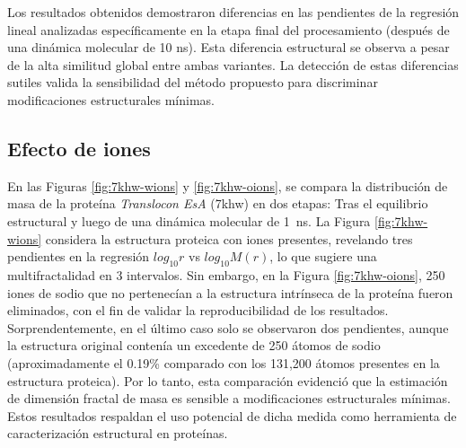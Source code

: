 	Los resultados obtenidos demostraron diferencias en las pendientes de la regresi\'{o}n lineal analizadas espec\'{i}ficamente en la etapa final del procesamiento (despu\'{e}s de una din\'{a}mica molecular de 10 ns). Esta diferencia estructural se observa a pesar de la alta similitud global entre ambas variantes.
	La detecci\'{o}n de estas diferencias sutiles valida la sensibilidad del m\'{e}todo propuesto para discriminar modificaciones estructurales m\'{i}nimas.
	
	\clearpage
	
	\subsection*{Efecto de iones}
	
	En las Figuras \ref{fig:7khw-wions} y \ref{fig:7khw-oions}, se compara la distribuci\'{o}n de masa de la prote\'{i}na \textit{Translocon EsA} (7khw) en dos etapas: Tras el equilibrio estructural y luego de una din\'{a}mica molecular de 1~ns. La Figura \ref{fig:7khw-wions} considera la estructura proteica con iones presentes, revelando tres pendientes en la regresi\'{o}n $log_{10}r$ vs $log_{10}M(r)$, lo que sugiere una multifractalidad en 3 intervalos. Sin embargo, en la Figura \ref{fig:7khw-oions}, 250 iones de sodio que no pertenec\'{i}an a la estructura intr\'{i}nseca de la prote\'{i}na fueron eliminados, con el fin de validar la reproducibilidad de los resultados. Sorprendentemente, en el \'{u}ltimo caso solo se observaron dos pendientes, aunque la estructura original conten\'{i}a  un excedente de 250 \'{a}tomos de sodio (aproximadamente el 0.19\% comparado con los 131,200 átomos presentes en la estructura proteica). Por lo tanto, esta comparaci\'{o}n evidenci\'{o} que la estimaci\'{o}n de dimensi\'{o}n fractal de masa es sensible a modificaciones estructurales m\'{i}nimas. Estos resultados respaldan el uso potencial de dicha medida como herramienta de caracterizaci\'{o}n estructural en prote\'{i}nas. 
 
 	\clearpage
 
